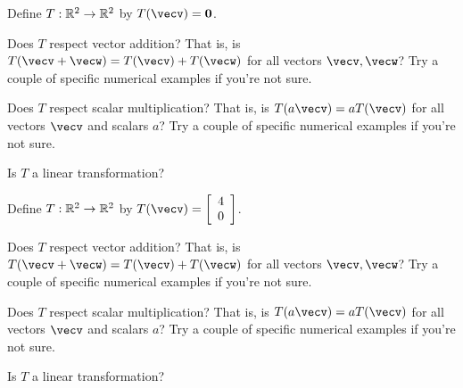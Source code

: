 \endedxproblem



Define $T: \mathbb R^2 \rightarrow \mathbb R^2$ by $T(\vecv) = \veco$.  

Does $T$ respect vector addition?  That is, is $T(\vecv + \vecw) = T(\vecv) + T(\vecw)$ for all 
vectors $\vecv,\vecw$?
Try a couple of specific numerical examples if you're not sure.  


Does $T$ respect scalar multiplication?  
That is, is $T(a\vecv) = aT(\vecv)$ for all vectors $\vecv$ and scalars $a$?
Try a couple of specific numerical examples if you're not sure.  



Is $T$ a linear transformation?



\endedxproblem


Define $T: \mathbb R^2 \rightarrow \mathbb R^2$ by $T(\vecv) = \left[\begin{array}{c}
4 \\
0 
\end{array} \right]$.  

Does $T$ respect vector addition?  That is, is $T(\vecv + \vecw) = T(\vecv) + T(\vecw)$ for all 
vectors $\vecv,\vecw$?
Try a couple of specific numerical examples if you're not sure.  


Does $T$ respect scalar multiplication?  
That is, is $T(a\vecv) = aT(\vecv)$ for all vectors $\vecv$ and scalars $a$?
Try a couple of specific numerical examples if you're not sure.  



Is $T$ a linear transformation?


